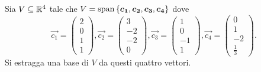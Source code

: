 \begin{example}
    Sia $V \subseteq \mathbb{R}^4$ tale che $V = \operatorname{span}\left\{\bm{c_1}, \bm{c_2}, \bm{c_3}, \bm{c_4}\right\}$ dove \[
        \vec{c_1} = \begin{pmatrix}
            2 \\ 0 \\ 1 \\ 1
        \end{pmatrix}, \vec{c_2} = \begin{pmatrix}
            3 \\ -2 \\ -2 \\ 0
        \end{pmatrix}, \vec{c_3} = \begin{pmatrix}
            1 \\ 0 \\ -1 \\ 1
        \end{pmatrix}, \vec{c_4} = \begin{pmatrix}
            0 \\ 1 \\ -2 \\ \frac{1}{3}
        \end{pmatrix}.
    \] Si estragga una base di $V$ da questi quattro vettori.
\end{example}
